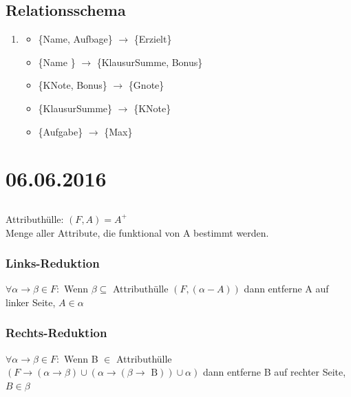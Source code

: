 \subsection{Relationsschema}
\begin{enumerate}
	\item
	\begin{itemize}
		\item \{Name, Aufbage\} $\to$ \{Erzielt\}
		\item \{Name \} $\to$ \{KlausurSumme, Bonus\}
		\item \{KNote, Bonus\} $\to$ \{Gnote\}
		\item \{KlausurSumme\} $\to$ \{KNote\}
		\item \{Aufgabe\} $\to$ \{Max\}
	\end{itemize}
\end{enumerate}
\section{06.06.2016}
\subsection{}
Attributhülle: $(F,A) = A^+$\\ Menge aller Attribute, die funktional von A bestimmt werden.
\subsubsection{Links-Reduktion}
$\forall \alpha \to \beta \in F: $ Wenn $\beta \subseteq $ Attributhülle $(F,(\alpha - A))$ dann entferne A auf linker Seite, $A \in \alpha$
\subsubsection{Rechts-Reduktion}
$\forall \alpha \to \beta \in F: $ Wenn B $ \in $ Attributhülle $(F\to(\alpha \to \beta) \cup (\alpha \to (\beta \to \text{ B}))\cup \alpha)$ dann entferne B auf rechter Seite, $B \in \beta$
